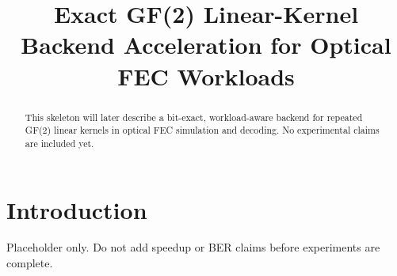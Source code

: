 \documentclass[conference]{IEEEtran}
\title{Exact GF(2) Linear-Kernel Backend Acceleration for Optical FEC Workloads}
\author{\IEEEauthorblockN{Author Names Omitted for Skeleton}}
\begin{document}
\maketitle

\begin{abstract}
This skeleton will later describe a bit-exact, workload-aware backend for repeated GF(2) linear kernels in optical FEC simulation and decoding. No experimental claims are included yet.
\end{abstract}

\section{Introduction}
Placeholder only. Do not add speedup or BER claims before experiments are complete.



\end{document}
